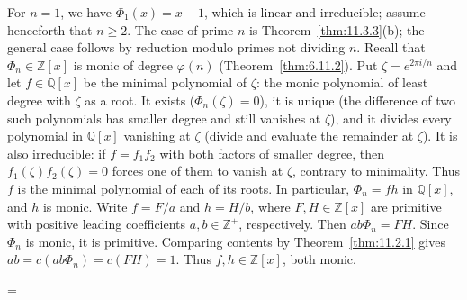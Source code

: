 \documentclass[11pt]{article}
\makeatletter
\theoremstyle{ntstyle}
\let\nt@closedisplay\]
\def\nt@guardedclose{\@ifnextchar\par{\nt@closeafterpar}{\@ifnextchar\end{\postdisplaypenalty\@M\nt@closedisplay}{\nt@closedisplay}}}
\def\nt@closeafterpar\par{\@ifnextchar\par{\nt@closeafterpar}{\@ifnextchar\end{\postdisplaypenalty\@M\nt@closedisplay\par}{\nt@closedisplay\par}}}
\renewenvironment{proof}[1][\proofname]{\par
  \pushQED{\qed}\normalfont\topsep\medskipamount\edef\nt@afterproof{\@endparpenalty=\the\@endparpenalty\relax}\@beginparpenalty\@M\@endparpenalty\@M\let\]\nt@guardedclose\trivlist\item[]\textit{#1\@addpunct{.}} \ignorespaces}{\ifvmode\addpenalty\@M\fi\popQED\nt@afterproof\endtrivlist\@endpefalse}
\makeatother
\begin{document}
\begin{proof} For $n=1$, we have $\Phi_1(x)=x-1$, which is linear and
	irreducible; assume henceforth that $n\ge2$. The case of prime $n$ is
	Theorem~\ref{thm:11.3.3}(b); the general case follows by reduction modulo
	primes not dividing $n$. Recall that $\Phi_n\in\mathbb{Z}[x]$ is monic of
	degree $\varphi(n)$ (Theorem~\ref{thm:6.11.2}). Put $\zeta = e^{2\pi
				i/n}$ and let $f\in\mathbb{Q}[x]$ be the minimal polynomial of
	$\zeta$: the monic polynomial of least degree with $\zeta$ as a root.
	It exists ($\Phi_n(\zeta) = 0$), it is unique (the difference of two
	such polynomials has smaller degree and still vanishes at $\zeta$),
	and it divides every polynomial in $\mathbb{Q}[x]$ vanishing at
	$\zeta$ (divide and evaluate the remainder at $\zeta$). It is also
	irreducible: if $f=f_1f_2$ with both factors of smaller degree, then
	$f_1(\zeta)f_2(\zeta)=0$ forces one of them to vanish at $\zeta$,
	contrary to minimality. Thus $f$ is the minimal polynomial of each of
	its roots. In particular, $\Phi_n=fh$ in $\mathbb{Q}[x]$, and $h$ is monic.
	Write $f=F/a$ and $h=H/b$, where $F,H\in\mathbb{Z}[x]$ are
	primitive with positive leading coefficients $a,b\in\mathbb{Z}^+$,
	respectively. Then $ab\Phi_n=FH$. Since $\Phi_n$ is monic, it is
	primitive. Comparing contents by Theorem~\ref{thm:11.2.1} gives
	$ab=c(ab\Phi_n)=c(FH)=1$. Thus $f,h\in\mathbb{Z}[x]$, both monic.


\end{proof}
\end{document}
